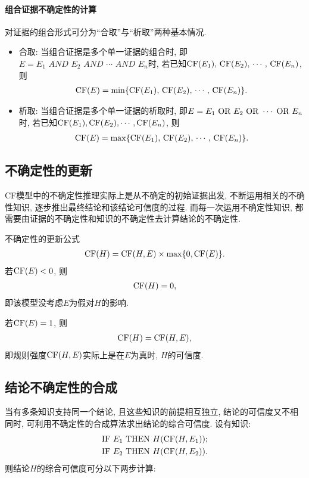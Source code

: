 \paragraph{组合证据不确定性的计算}
对证据的组合形式可分为“合取”与“析取”两种基本情况.
\begin{itemize}
    \item 合取: 当组合证据是多个单一证据的组合时, 即 $E=E_1\,\,  AND\,\,    E_2\,\,    AND \,\,   \cdots\,\,     AND \,\,   E_n$时, 若已知$\textup{CF}(E_1),\, \textup{CF}(E_2),\, \cdots,\, \textup{CF}(E_n)$, 则
    \begin{align}
        \textup{CF}(E)=\min\{\textup{CF}(E_1),\, \textup{CF}(E_2),\, \cdots ,\,\textup{CF}(E_n)\}.
    \end{align}
    \item 析取: 当组合证据是多个单一证据的析取时, 即$E=E_1\,\,  \textup{OR}\,\,  E_2 \,\, \textup{OR}\,\,  \cdots \,\,  \textup{OR}\,\, E_n$时, 若已知$\textup{CF}(E_1), \textup{CF}(E_2), \cdots , \textup{CF}(E_n)$, 则
    \begin{align}
        \textup{CF}(E)=\max\{\textup{CF}(E_1),\, \textup{CF}(E_2),\, \cdots ,\,\textup{CF}(E_n)\}.
    \end{align}
\end{itemize}

\subsection{不确定性的更新}
CF模型中的不确定性推理实际上是从不确定的初始证据出发, 不断运用相关的不确性知识, 逐步推出最终结论和该结论可信度的过程. 而每一次运用不确定性知识, 都需要由证据的不确定性和知识的不确定性去计算结论的不确定性.

不确定性的更新公式
\begin{align}
    \textup{CF}(H)=\textup{CF}(H, E)\times \max\{0, \textup{CF}(E)\}.
\end{align}
    若$\textup{CF}(E)<0$, 则
\begin{align}
    \textup{CF}(H)=0,
\end{align}
即该模型没考虑$E$为假对$H$的影响.

若$\textup{CF}(E)=1$, 则
\begin{align}
    \textup{CF}(H)=\textup{CF}(H,E),
\end{align}
即规则强度$\textup{CF}(H,E)$实际上是在$E$为真时, $H$的可信度.
\subsection{结论不确定性的合成}
当有多条知识支持同一个结论, 且这些知识的前提相互独立, 结论的可信度又不相同时, 可利用不确定性的合成算法求出结论的综合可信度.
    设有知识:
\begin{align}
  &\textup{IF}\,\,    E_1\,\,     \textup{THEN} \,\,    H(\textup{CF}(H, E_1));\\
  &\textup{IF}\,\,    E_2 \,\,    \textup{THEN} \,\,    H(\textup{CF}(H, E_2)).
\end{align}
则结论$H$的综合可信度可分以下两步计算:

